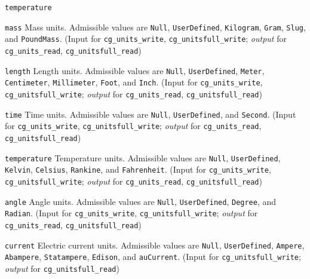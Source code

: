 \begin{Ventryi}{\texttt{temperature}}\raggedright
\item [\texttt{mass}]
      Mass units.
      Admissible values are \texttt{Null}, \texttt{UserDefined},
      \texttt{Kilogram}, \texttt{Gram}, \texttt{Slug}, and
      \texttt{PoundMass}.
      (\textcolor{input}{Input} for \texttt{cg\_units\_write},
      \texttt{cg\_unitsfull\_write};
      \textcolor{output}{\textit{output}} for \texttt{cg\_units\_read},
      \texttt{cg\_unitsfull\_read})
\item [\texttt{length}]
      Length units.
      Admissible values are \texttt{Null}, \texttt{UserDefined},
      \texttt{Meter}, \texttt{Centimeter}, \texttt{Millimeter},
      \texttt{Foot}, and \texttt{Inch}.
      (\textcolor{input}{Input} for \texttt{cg\_units\_write},
      \texttt{cg\_unitsfull\_write};
      \textcolor{output}{\textit{output}} for \texttt{cg\_units\_read},
      \texttt{cg\_unitsfull\_read})
\item [\texttt{time}]
      Time units.
      Admissible values are \texttt{Null}, \texttt{UserDefined}, and
      \texttt{Second}.
      (\textcolor{input}{Input} for \texttt{cg\_units\_write},
      \texttt{cg\_unitsfull\_write};
      \textcolor{output}{\textit{output}} for \texttt{cg\_units\_read},
      \texttt{cg\_unitsfull\_read})
\item [\texttt{temperature}]
      Temperature units.
      Admissible values are \texttt{Null}, \texttt{UserDefined},
      \texttt{Kelvin}, \texttt{Celsius}, \texttt{Rankine}, and
      \texttt{Fahrenheit}.
      (\textcolor{input}{Input} for \texttt{cg\_units\_write},
      \texttt{cg\_unitsfull\_write};
      \textcolor{output}{\textit{output}} for \texttt{cg\_units\_read},
      \texttt{cg\_unitsfull\_read})
\item [\texttt{angle}]
      Angle units.
      Admissible values are \texttt{Null}, \texttt{UserDefined},
      \texttt{Degree}, and \texttt{Radian}.
      (\textcolor{input}{Input} for \texttt{cg\_units\_write},
      \texttt{cg\_unitsfull\_write};
      \textcolor{output}{\textit{output}} for \texttt{cg\_units\_read},
      \texttt{cg\_unitsfull\_read})
\item [\texttt{current}]
      Electric current units.
      Admissible values are \texttt{Null}, \texttt{UserDefined},
      \texttt{Ampere}, \texttt{Abampere}, \texttt{Statampere},
      \texttt{Edison}, and \texttt{auCurrent}.
      (\textcolor{input}{Input} for \texttt{cg\_unitsfull\_write};
      \textcolor{output}{\textit{output}} for \texttt{cg\_unitsfull\_read})

\end{Ventryi}
